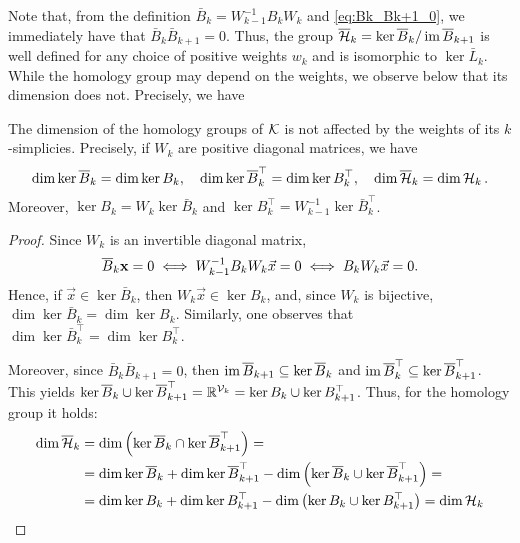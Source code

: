 Note that, from the definition \( \bar B_k= W_{k-1}^{-1} B_k W_k \) and \eqref{eq:Bk_Bk+1_0}, we immediately have that  \( \bar B_k\bar B_{k+1}=0 \). Thus, the group \( \overline{\mathcal{H}}_k = \ker \overline{B}_k / \operatorname{im} \overline{B}_{k+1} \) is well defined for any choice of positive weights  \( w_k \) and is isomorphic to \( \ker \bar L_k \). While the homology group may depend on the weights,  we observe below that its dimension does not. Precisely, we have 
\begin{proposition}
 \label{thm:wHomGroup}
     The dimension of the homology groups of \( \mathcal{K} \) is not affected by the weights of its \( k \)-simplicies. Precisely, if \( W_k \) are positive diagonal matrices, we have
     \begin{equation}
         \dim \ker \overline{B}_k = \dim \ker B_k, \quad \dim \ker \overline{B}_k^\top = \dim \ker B_k^\top, \quad \dim \overline{\mathcal{H}}_k = \dim \mathcal{H}_k\, .
     \end{equation}
     Moreover, \( \ker B_k = W_k \ker \bar B_k \) and \( \ker B_k^\top = W_{k-1}^{-1} \ker \bar B_k^\top \).
\end{proposition}

\begin{proof}
Since \( W_k \) is an invertible diagonal matrix, 
\begin{equation*}
    \overline{B}_k \mathbf{x} = 0 \iff W_{k-1}^{-1}B_k W_k \vec x =0 \iff B_k W_k \vec x =0. 
\end{equation*}
Hence, if \( \vec x \in \ker \bar B_k \), then \( W_k \vec x \in \ker B_k \), and, since \( W_k \) is bijective, \( \dim \ker \bar B_k = \dim \ker B_k \). Similarly, one observes that \( \dim \ker \bar B_k^\top = \dim \ker B_k^\top \).

Moreover, since \( \bar B_k \bar B_{k+1} =0 \), then \( \operatorname{im} \overline{B}_{k+1} \subseteq \ker \overline{B}_k \) and \( \operatorname{im} \overline{B}_k^\top \subseteq \ker \overline{B}_{k+1}^\top \). This yields \( \ker \overline{B}_k \cup \ker \overline{B}_{k+1}^\top = \mathbb{R}^{\mathcal{V}_k} = \ker B_k \cup \ker  B_{k+1}^\top\). Thus, for the homology group it holds:
\begin{equation*}
      \begin{aligned}
    \dim \overline{\mathcal{H}}_k & = \dim \left( \ker \overline{B}_k \cap \ker \overline{B}_{k+1}^\top \right)= \\
    & = \dim \ker \overline{B}_k + \dim \ker \overline{B}_{k+1}^\top - \dim \left( \ker \overline{B}_k \cup \ker \overline{B}_{k+1}^\top \right) = \\
    & = \dim \ker B_k + \dim \ker  B_{k+1}^\top - \dim \left( \ker  B_k \cup \ker  B_{k+1}^\top \right) = \dim \mathcal{H}_k
      \end{aligned}
\end{equation*}
\end{proof}




